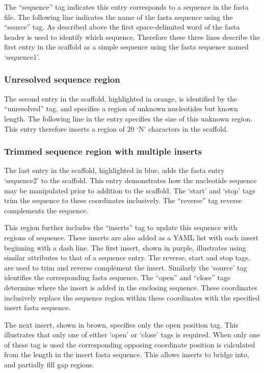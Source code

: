\documentclass[10pt]{bmc_article}
\newenvironment{bmcformat}{\begin{raggedright}\baselineskip20pt\sloppy\setboolean{publ}{false}}{\end{raggedright}\baselineskip20pt\sloppy}
\begin{document}
\begin{bmcformat}
The ``sequence'' tag indicates this entry corresponds to a sequence in the
fasta file. The following line indicates the name of the fasta sequence using
the ``source'' tag. As described above the first space-delimited word of the
fasta header is used to identify which sequence. Therefore these three lines
describe the first entry in the scaffold as a simple sequence using the fasta
sequence named `sequence1'. \pb

\subsubsection*{Unresolved sequence region} %

The second entry in the scaffold, highlighted in orange, is identified by the
``unresolved'' tag, and specifies a region of unknown nucleotides but known
length. The following line in the entry specifies the size of this unknown
region. This entry therefore inserts a region of 20 `N' characters in the
scaffold. \pb

\subsubsection*{Trimmed sequence region with multiple inserts} %

The last entry in the scaffold, highlighted in blue, adds the fasta entry
`sequence2' to the scaffold. This entry demonstrates how the nucleotide
sequence may be manipulated prior to addition to the scaffold. The `start' and
`stop' tags trim the sequence to these coordinates inclusively. The
``reverse'' tag reverse complements the sequence. \pb

This region further includes the ``inserts'' tag to update this sequence with
regions of sequence. These inserts are also added as a YAML list with each
insert beginning with a dash line. The first insert, shown in purple,
illustrates using similar attributes to that of a sequence entry. The reverse,
start and stop tags, are used to trim and reverse complement the insert.
Similarly the `source' tag identifies the corresponding fasta sequence. The
``open'' and ``close'' tags determine where the insert is added in the
enclosing sequence. These coordinates inclusively replace the sequence region
within these coordinates with the specified insert fasta sequence. \pb

The next insert, shown in brown, specifies only the open position tag. This
illustrates that only one of either `open' or `close' tags is required. When
only one of these tag is used the corresponding opposing coordinate position
is calculated from the length in the insert fasta sequence. This allows
inserts to bridge into, and partially fill gap regions. \pb


\end{bmcformat}
\end{document}
